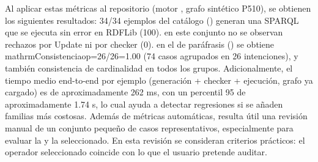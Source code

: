 {}Al aplicar estas métricas al repositorio (motor , grafo sintético P510), se obtienen los siguientes resultados:\markdownRendererInterblockSeparator
{}\markdownRendererUlBeginTight
\markdownRendererUlItem {} 34/34 ejemplos del catálogo () generan una SPARQL que se ejecuta sin error en RDFLib (100\markdownRendererBackslash{}\markdownRendererPercentSign{}).\markdownRendererUlItemEnd 
\markdownRendererUlItem {} en este conjunto no se observan rechazos por Update ni por checker (0\markdownRendererBackslash{}\markdownRendererPercentSign{}).\markdownRendererUlItemEnd 
\markdownRendererUlItem {} en el  de paráfrasis () se obtiene \markdownRendererBackslash{}\markdownRendererDollarSign{}\markdownRendererBackslash{}mathrm\markdownRendererLeftBrace{}Consistencia\markdownRendererRightBrace{}\markdownRendererUnderscore{}\markdownRendererLeftBrace{}op\markdownRendererRightBrace{}=26/26=1.00\markdownRendererBackslash{}\markdownRendererDollarSign{} (74 casos agrupados en 26 intenciones), y también consistencia de cardinalidad en todos los grupos.\markdownRendererUlItemEnd 
\markdownRendererUlEndTight \markdownRendererInterblockSeparator
{}Adicionalmente, el tiempo medio end-to-end por ejemplo (generación + checker + ejecución, grafo ya cargado) es de aproximadamente 262 ms, con un percentil 95 de aproximadamente 1.74 s, lo cual ayuda a detectar regresiones si se añaden familias más costosas.\markdownRendererInterblockSeparator
{}\markdownRendererInterblockSeparator
{}Además de métricas automáticas, resulta útil una revisión manual de un conjunto pequeño de casos representativos, especialmente para evaluar la  y la  seleccionado.\markdownRendererInterblockSeparator
{}En esta revisión se consideran criterios prácticos:\markdownRendererInterblockSeparator
{}\markdownRendererUlBeginTight
\markdownRendererUlItem {} el operador seleccionado coincide con lo que el usuario pretende auditar.\markdownRendererUlItemEnd 
